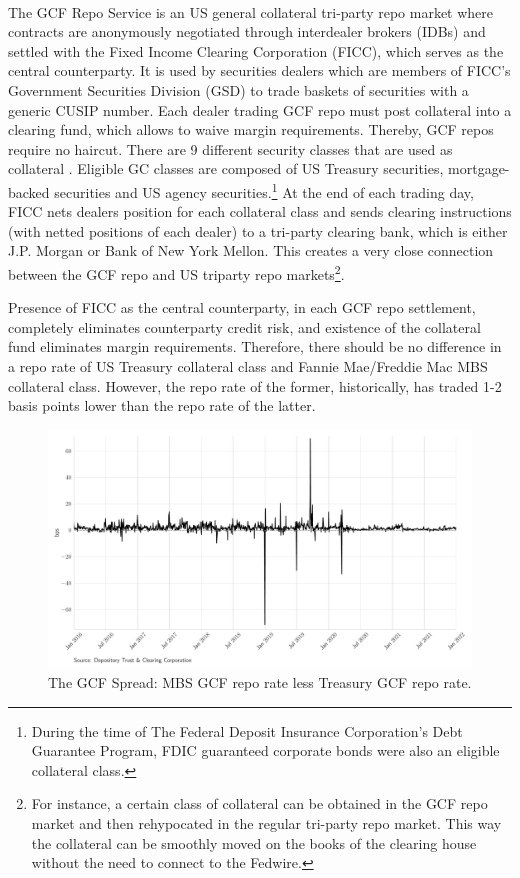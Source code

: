 \documentclass[11pt,a4paper,english,oneside]{article}
\begin{document}
The GCF Repo\textsuperscript{\tiny\textregistered} Service is an US general collateral tri-party repo market where contracts are anonymously negotiated through interdealer brokers (IDBs) and settled with the Fixed Income Clearing Corporation (FICC), which serves as the central counterparty.  It is used by securities dealers which are members of FICC's Government Securities Division (GSD) to trade baskets of securities with a generic CUSIP number. Each dealer trading GCF repo must post collateral into a clearing fund, which allows to waive margin requirements. Thereby, GCF repos require no haircut. There are 9 different security classes that are used as collateral \citep{dtcc2012}. Eligible GC classes are composed of US Treasury securities, mortgage-backed securities and US agency securities.\footnote{During the time of The Federal Deposit Insurance Corporation’s Debt Guarantee Program, FDIC guaranteed corporate bonds were also an eligible collateral class.} At the end of each trading day, FICC nets dealers position for each collateral class and sends clearing instructions (with netted positions of each dealer) to a tri-party clearing bank, which is either J.P. Morgan or Bank of New York Mellon. This creates a very close connection between the GCF repo and US triparty repo markets\footnote{For instance, a certain class of collateral can be obtained in the GCF repo market and then rehypocated in the regular tri-party repo market. This way the collateral can be smoothly moved on the books of the clearing house without the need to connect to the Fedwire.}.

Presence of FICC as the central counterparty, in each GCF repo settlement, completely eliminates counterparty credit risk, and existence of the collateral fund eliminates margin requirements. Therefore, there should be no difference in a repo rate of US Treasury collateral class and Fannie Mae/Freddie Mac MBS collateral class. However, the repo rate of the former, historically, has traded 1-2 basis points lower than the repo rate of the latter. 

\begin{figure}[htb!]
  \begin{center}
    \caption{The GCF Spread: MBS GCF repo rate less Treasury GCF repo rate.}
    \label{fig:rates}
    \includegraphics[width=0.99\linewidth]{gcf_spread.pdf}
  \end{center}
\end{figure}
\end{document}

